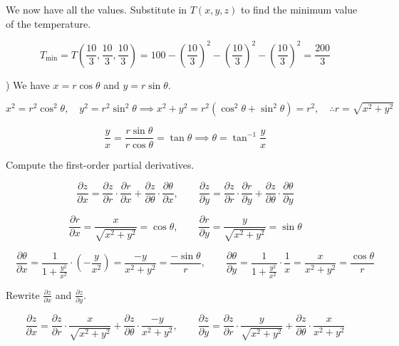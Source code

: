 \documentclass{article}
\begin{document}
\hfill

\noindent We now have all the values. Substitute in $T(x,y,z)$ to find the minimum value of the temperature.

\[T_{\text{min}}=T\left(\frac{10}{3},\frac{10}{3},\frac{10}{3}\right)=100-\left(\frac{10}{3}\right)^2-\left(\frac{10}{3}\right)^2-\left(\frac{10}{3}\right)^2=\boxed{\frac{200}{3}}\]

\hfill

) We have $x=r\cos\theta$ and $y=r\sin\theta$.

\[x^2=r^2\cos^2\theta,\quad y^2 =r^2\sin^2\theta\implies x^2+y^2=r^2\left(\cos^2\theta+\sin^2\theta\right)=r^2, \quad \therefore  r=\sqrt{x^2+y^2}\]

\[\frac{y}{x}=\frac{r\sin\theta}{r\cos\theta}=\tan\theta \implies \theta=\tan^{-1}\frac{y}{x}\]

\hfill

\noindent Compute the first-order partial derivatives.

\[\frac{\partial z}{\partial x}=\frac{\partial z}{\partial r}\cdot\frac{\partial r}{\partial x}+\frac{\partial z}{\partial \theta}\cdot\frac{\partial\theta}{\partial x},\quad\quad\frac{\partial z}{\partial y}=\frac{\partial z}{\partial r}\cdot\frac{\partial r}{\partial y} + \frac{\partial z}{\partial\theta}\cdot\frac{\partial\theta}{\partial y}\]

\hfill

\[\frac{\partial r}{\partial x}=\frac{x}{\sqrt{x^2+y^2}}=\cos\theta,\quad\quad\frac{\partial r}{\partial y}=\frac{y}{\sqrt{x^2+y^2}}=\sin\theta\]

\newpage

\[\quad\frac{\partial\theta}{\partial x}=\frac{1}{\displaystyle 1+\frac{y^2}{x^2}}\cdot \left(-\frac{y}{x^2}\right)=\frac{-y}{x^2+y^2}=\frac{-\sin\theta}{r},\quad\quad\frac{\partial\theta}{\partial y}=\frac{1}{\displaystyle1+\frac{y^2}{x^2}}\cdot\frac{1}{x}=\frac{x}{x^2+y^2}=\frac{\cos\theta}{r}\]

\hfill

\noindent Rewrite $\displaystyle\frac{\partial z}{\partial x}$ and $\displaystyle\frac{\partial z}{\partial y}$.

\[\frac{\partial z}{\partial x}=\frac{\partial z}{\partial r}\cdot\frac{x}{\sqrt{x^2+y^2}}+\frac{\partial z}{\partial\theta}\cdot\frac{-y}{x^2+y^2},\quad\quad\frac{\partial z}{\partial y}=\frac{\partial z}{\partial r}\cdot\frac{y}{\sqrt{x^2+y^2}}+\frac{\partial z}{\partial \theta}\cdot\frac{x}{x^2+y^2}\]
\end{document}
